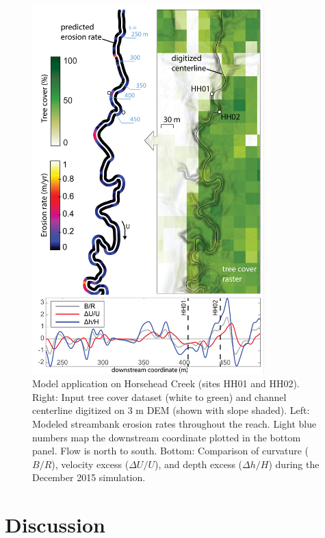 \documentclass[preprint, review, authoryear, 12pt]{elsarticle}
\begin{document}
\begin{figure}
\centering
\vspace{-1in}
\includegraphics[width=0.8\textwidth]{figs/hh01-model-results.png}
\caption{Model application on Horsehead Creek (sites HH01 and HH02). Right: Input tree cover dataset (white to green) and channel centerline digitized on 3 m DEM (shown with slope shaded). Left: Modeled streambank erosion rates throughout the reach. Light blue numbers map the downstream coordinate plotted in the bottom panel. Flow is north to south. Bottom: Comparison of curvature ($B/R$), velocity excess ($\Delta U/U$), and depth excess ($\Delta h/H$) during the December 2015 simulation.}\label{fig:hh01}
\end{figure}

\section{Discussion}
\end{document}
